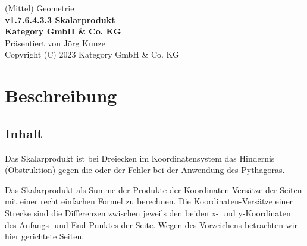 \documentclass[a4paper]{amsart}
\theoremstyle{definition}
\begin{document}
\begin{titlepage}
\centering
{\huge
(Mittel) Geometrie\\[1cm]
\textbf{v1.7.6.4.3.3 Skalarprodukt}
}\\[1cm]

\textbf{Kategory GmbH \& Co. KG}\\
Präsentiert von Jörg Kunze\\
Copyright (C) 2023 Kategory GmbH \& Co. KG

\end{titlepage}

%

\newpage

\section*{Beschreibung}

\subsection*{Inhalt}
Das Skalarprodukt ist bei Dreiecken im Koordinatensystem das Hindernis (Obstruktion) gegen die oder der Fehler bei der Anwendung des Pythagoras.

Das Skalarprodukt als Summe der Produkte der Koordinaten-Versätze der Seiten mit einer recht einfachen Formel zu berechnen. Die Koordinaten-Versätze einer Strecke sind die Differenzen zwischen jeweils den beiden x- und y-Koordinaten des Anfangs- und End-Punktes der Seite. Wegen des Vorzeichens betrachten wir hier gerichtete Seiten.
\end{document}
